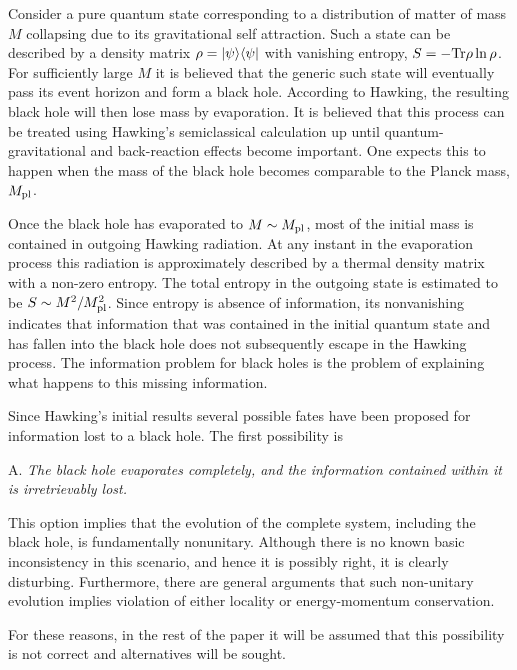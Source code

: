 {}
Consider a pure quantum state
corresponding to a distribution of matter of
mass $M$ collapsing due to its gravitational self attraction.  Such a
state can be described by a density matrix $\rho=\vert\psi\rangle\langle\psi\vert$
with vanishing entropy, $S=-{\rm Tr}\rho\ln\rho$.  For sufficiently
large $M$ it is believed that the generic such state will eventually
pass its event horizon and form a black hole.  According to
Hawking,
the resulting black hole will then lose mass by evaporation.  It is
believed that this process can be treated using Hawking's semiclassical
calculation up until quantum-gravitational and back-reaction
effects become important.  One expects this to happen when
the mass of the black hole becomes comparable to the Planck mass, $M_{\rm pl}$.

Once the black hole has evaporated to $M\sim M_{\rm pl}$, most of
the initial mass is contained in outgoing Hawking radiation.  At
any instant in the evaporation process this radiation is approximately
described
by a
thermal density matrix with a non-zero entropy.  The total entropy in
the outgoing state is estimated to be
$S\sim M^2/M_{\rm pl}^2$.  Since entropy is absence of information,
its nonvanishing indicates that information
that was contained in
the initial quantum state and has fallen into the black hole does
not subsequently escape in the Hawking process.  The information
problem for black holes is the problem of explaining what happens to
this missing information.

Since Hawking's initial results several possible fates have been proposed
for information
lost to a black hole.
The first possibility is

\item{A.}  {\it The black hole evaporates completely, and the information
contained within it is irretrievably lost.}

This option implies that the
evolution of the complete system, including the black hole, is
fundamentally nonunitary.  Although there is no known basic
inconsistency in this scenario, and hence it is possibly right, it
is clearly disturbing. Furthermore,
there are general arguments that such non-unitary
evolution implies violation of either locality or energy-momentum
conservation.

For these reasons, in the rest of the paper it will
be assumed that this possibility is not correct and alternatives will
be sought.

